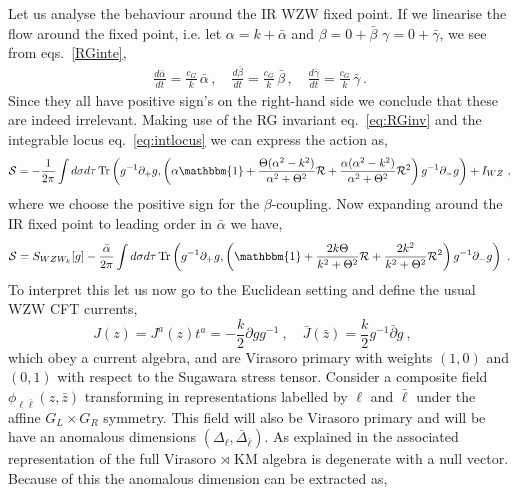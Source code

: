 \documentclass[12pt]{article}
\newcommand{\Tr}{\operatorname{Tr}}
\def\ee{\boldsymbol{e}}
\def\be{\begin{equation}}
\def\ee{\end{equation}}
\begin{document}
Let us analyse the behaviour around the IR WZW fixed point.   If we linearise the flow around the fixed point, i.e. let $\alpha = k + \bar\alpha$ and $\beta =0+ \bar\beta$ $\gamma = 0+ \bar \gamma$, we see from   eqs.~\eqref{RGinte}, 
     \begin{eqnarray}
  \label{eq:RGEs2 } 
\frac{d \bar \alpha}{dt} =  \frac{c_G}{k }\, \bar \alpha  \,,\quad
 \frac{d \bar \beta}{dt} =  \frac{c_G}{k }\, \bar \beta  \,,\quad
 \frac{d \bar \gamma }{dt} =  \frac{c_G}{k }\, \bar \gamma  \, .
 \end{eqnarray}  
 Since they all have positive sign's on the right-hand side we conclude that these are indeed irrelevant. Making use of the RG invariant eq.~\eqref{eq:RGinv} and   the integrable locus eq.~\eqref{eq:intlocus} we can express the action as,
  \be 
\label{eq:act2}
 {\cal S }= -\frac{1}{2\pi}\int d \sigma d\tau    \Tr\left(  g^{-1} \partial_+g , \left(\alpha \mathbbm{1} + \frac{\Theta (\alpha^2 - k^2) }{\alpha^2 + \Theta^2} {\cal R}  +  \frac{\alpha (\alpha^2 - k^2) }{\alpha^2 + \Theta^2}    {\cal R}^2 \right)g^{-1} \partial_- g \right) +  I_{WZ}\ ,
  \ee
 where we choose the positive sign for the $\beta$-coupling. Now expanding around the IR fixed point to leading order in $\bar{\alpha}$  we have, 
    \be 
\label{eq:act3}
 {\cal S }=  S_{WZW_k}[g] -\frac{\bar{\alpha}  }{2\pi}\int d \sigma d\tau     \Tr\left(  g^{-1} \partial_+g , \left(  \mathbbm{1} + \frac{2 k\Theta  }{k^2 + \Theta^2} {\cal R}  +  \frac{ 2 k^2  }{k^2 + \Theta^2}    {\cal R}^2 \right)g^{-1} \partial_- g \right)  \ .
   \ee
  To interpret this let us now go to the Euclidean setting and define the usual WZW CFT currents,   
  \be
  J(z)= J^a(z) t^a = - \frac{k}{2} \partial g g^{-1} \ , \quad   \bar J(\bar z) =   \frac{ k}{2}    g^{-1} \bar\partial g   \ , \quad   
  \ee   
   which obey  a current algebra,
    and are Virasoro primary with weights  $(1,0)$ and $(0,1)$ with respect to the  Sugawara stress tensor. 
   Consider a composite field $\phi_{\ell \bar{\ell} }(z, \bar{z})$   transforming in representations labelled by $\ell$ and $\bar{\ell}$ under the affine $G_L \times G_R$ symmetry.  This field will also be Virasoro primary and will be have an anomalous dimensions $(\Delta_\ell, \bar\Delta_{\bar \ell}) $.   As explained in \cite{Knizhnik:1984nr} the associated representation of the full Virasoro $\rtimes$ KM algebra is degenerate with a null vector.  Because of this the anomalous dimension can be extracted as, 
\end{document}
